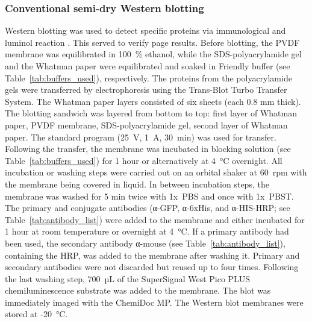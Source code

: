 \subsubsection{Conventional semi-dry Western blotting} \label{txt:cWB}
Western blotting was used to detect specific proteins via immunological and luminol reaction \parencite{towbin_electrophoretic_1979}. This served to verify \gls{page} results. Before blotting, the PVDF membrane was equilibrated in 100~\% ethanol, while the SDS-polyacrylamide gel and the Whatman paper were equilibrated and soaked in Friendly buffer (see Table~\ref{tab:buffers_used}), respectively. The proteins from the polyacrylamide gels were transferred by electrophoresis using the Trans-Blot Turbo Transfer System. The Whatman paper layers consisted of six sheets (each 0.8 mm thick). The blotting sandwich was layered from bottom to top: first layer of Whatman paper, PVDF membrane, SDS-polyacrylamide gel, second layer of Whatman paper. The standard program (25~V, 1~A, 30~min) was used for transfer. Following the transfer, the membrane was incubated in blocking solution (see Table~\ref{tab:buffers_used}) for 1 hour or alternatively at 4~°C overnight. All incubation or washing steps were carried out on an orbital shaker at 60~rpm  with the membrane being covered in liquid. In between incubation steps, the membrane was washed for 5 min twice with 1x~\gls{PBS} and once with 1x~\gls{PBST}. The primary and conjugate antibodies (\textgreek{α}-GFP, \textgreek{α}-6xHis, and \textgreek{α}-HIS-HRP; see Table~\ref{tab:antibody_list}) were added to the membrane and either incubated for 1 hour at room temperature or overnight at 4~°C. If a primary antibody had been used, the secondary antibody \textgreek{α}-mouse (see Table~\ref{tab:antibody_list}), containing the \gls{HRP}, was added to the membrane after washing it. Primary and secondary antibodies were not discarded but reused up to four times. Following the last washing step, 700~µL of the SuperSignal West Pico PLUS chemiluminescence substrate was added to the membrane. The blot was immediately imaged with the ChemiDoc MP. The Western blot membranes were stored at -20~°C. 
